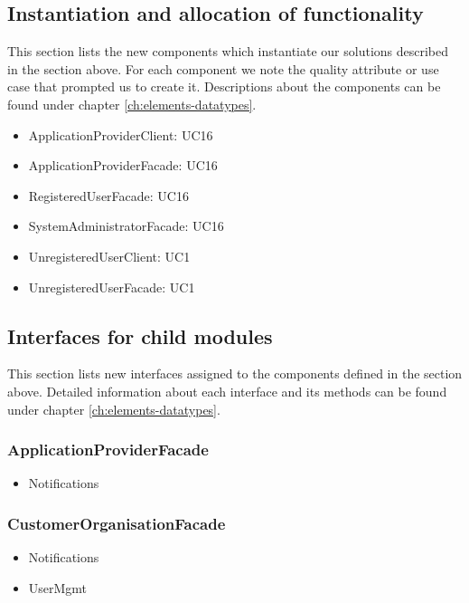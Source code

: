 \subsection*{Instantiation and allocation of functionality}
    This section lists the new components which instantiate our solutions
    described in the section above. For each component we note the quality
    attribute or use case that prompted us to create it. Descriptions about
    the components can be found under chapter \ref{ch:elements-datatypes}. \\

    \begin{itemize}
        \item ApplicationProviderClient: UC16
        \item ApplicationProviderFacade: UC16
        \item RegisteredUserFacade: UC16
        \item SystemAdministratorFacade: UC16
        \item UnregisteredUserClient: UC1
        \item UnregisteredUserFacade: UC1
    \end{itemize}


\subsection*{Interfaces for child modules}
    This section lists new interfaces assigned to the components defined
    in the section above. Detailed information about each interface and
    its methods can be found under chapter \ref{ch:elements-datatypes}.

    \subsubsection{ApplicationProviderFacade}
        \begin{itemize}
            \item Notifications
        \end{itemize}

    \subsubsection{CustomerOrganisationFacade}
        \begin{itemize}
            \item Notifications
            \item UserMgmt
        \end{itemize}

